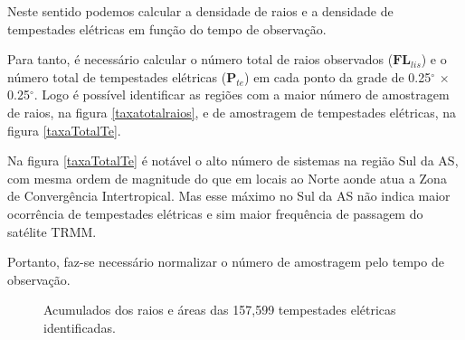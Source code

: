 

Neste sentido podemos calcular a densidade de raios e a densidade de tempestades elétricas em função do tempo de observação.

Para tanto, é necessário calcular o número total de raios observados ($\mathbf{FL}_{lis}$) e o número total de tempestades elétricas ($\mathbf{P}_{te}$) em cada ponto da grade de 0.25$^{\circ}$ $\times$ 0.25$^{\circ}$. Logo é possível identificar as regiões com a maior número de amostragem de raios, na figura \ref{taxatotalraios}, e de amostragem de tempestades elétricas, na figura \ref{taxaTotalTe}.



Na figura \ref{taxaTotalTe} é notável o alto número de sistemas na região Sul da AS, com mesma ordem de magnitude do que em locais ao Norte aonde atua a Zona de Convergência Intertropical. Mas esse máximo no Sul da AS não indica maior ocorrência de tempestades elétricas e sim maior frequência de passagem do satélite TRMM. 

Portanto, faz-se necessário normalizar o número de amostragem pelo tempo de observação.

\begin{figure}[!ht]

\caption{Acumulados dos raios e áreas das 157,599 tempestades elétricas identificadas.}
\label{gridSistemas} 
\end{figure} 

